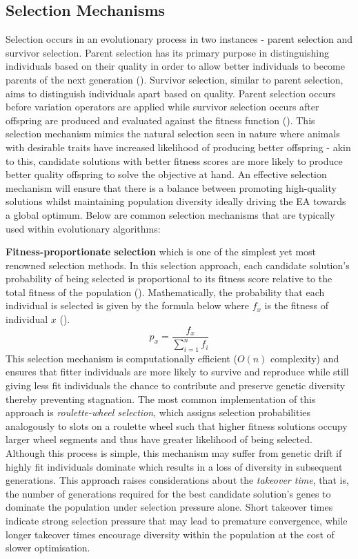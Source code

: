 \subsection{Selection Mechanisms}\label{sec:selection_mechanisms}
Selection occurs in an evolutionary process in two instances - parent selection and survivor selection. Parent selection has its primary purpose in distinguishing individuals based on their quality in order to allow better individuals to become parents of the next generation (\cite{handsOnGeneticAlgorithms}). Survivor selection, similar to parent selection, aims to distinguish individuals apart based on quality. Parent selection occurs before variation operators are applied while survivor selection occurs after offspring are produced and evaluated against the fitness function (\cite{book_introduction_to_evolutionary_computing}). This selection mechanism mimics the natural selection seen in nature where animals with desirable traits have increased likelihood of producing better offspring - akin to this, candidate solutions with better fitness scores are more likely to produce better quality offspring to solve the objective at hand. An effective selection mechanism will ensure that there is a balance between promoting high-quality solutions whilst maintaining population diversity ideally driving the EA towards a global optimum. Below are common selection mechanisms that are typically used within evolutionary algorithms:

\parbreak\noindent \textbf{Fitness-proportionate selection} which is one of the simplest yet most renowned selection methods. In this selection approach, each candidate solution's probability of being selected is proportional to its fitness score relative to the total fitness of the population (\cite{shukla2015comparative}). Mathematically, the probability that each individual is selected is given by the formula below where $f_x$ is the fitness of individual $x$ (\cite{shukla2015comparative}).
\begin{equation}
	p_x = \frac{f_x}{\sum^{n}_{i=1}f_i}
\end{equation}
This selection mechanism is computationally efficient ($O(n)$ complexity) and ensures that fitter individuals are more likely to survive and reproduce while still giving less fit individuals the chance to contribute and preserve genetic diversity thereby preventing stagnation. The most common implementation of this approach is \textit{roulette-wheel selection}, which assigns selection probabilities analogously to slots on a roulette wheel such that higher fitness solutions occupy larger wheel segments and thus have greater likelihood of being selected. Although this process is simple, this mechanism may suffer from genetic drift if highly fit individuals dominate which results in a loss of diversity in subsequent generations. This approach raises considerations about the \textit{takeover time}, that is, the number of generations required for the best candidate solution's genes to dominate the population under selection pressure alone. Short takeover times indicate strong selection pressure that may lead to premature convergence, while longer takeover times encourage diversity within the population at the cost of slower optimisation.

